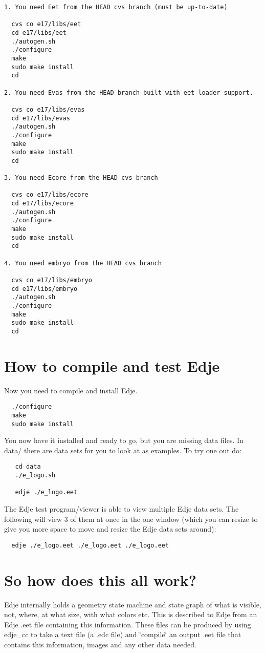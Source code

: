 \footnotesize\begin{verbatim}
1. You need Eet from the HEAD cvs branch (must be up-to-date)

  cvs co e17/libs/eet
  cd e17/libs/eet
  ./autogen.sh
  ./configure
  make
  sudo make install
  cd

2. You need Evas from the HEAD branch built with eet loader support.

  cvs co e17/libs/evas
  cd e17/libs/evas
  ./autogen.sh
  ./configure
  make
  sudo make install
  cd
  
3. You need Ecore from the HEAD cvs branch

  cvs co e17/libs/ecore
  cd e17/libs/ecore
  ./autogen.sh
  ./configure
  make
  sudo make install
  cd

4. You need embryo from the HEAD cvs branch

  cvs co e17/libs/embryo
  cd e17/libs/embryo
  ./autogen.sh
  ./configure
  make
  sudo make install
  cd

\end{verbatim}
\normalsize
\hypertarget{index_compiling}{}\section{How to compile and test Edje}\label{index_compiling}
Now you need to compile and install Edje.



\footnotesize\begin{verbatim}
  ./configure
  make
  sudo make install
\end{verbatim}
\normalsize


You now have it installed and ready to go, but you are missing data files. In data/ there are data sets for you to look at as examples. To try one out do:



\footnotesize\begin{verbatim}
   cd data
   ./e_logo.sh
   
   edje ./e_logo.eet
\end{verbatim}
\normalsize


The Edje test program/viewer is able to view multiple Edje data sets. The following will view 3 of them at once in the one window (which you can resize to give you more space to move and resize the Edje data sets around):



\footnotesize\begin{verbatim}
  edje ./e_logo.eet ./e_logo.eet ./e_logo.eet
\end{verbatim}
\normalsize
\hypertarget{index_details}{}\section{So how does this all work?}\label{index_details}
Edje internally holds a geometry state machine and state graph of what is visible, not, where, at what size, with what colors etc. This is described to Edje from an Edje .eet file containing this information. These files can be produced by using edje\_\-cc to take a text file (a .edc file) and \char`\"{}compile\char`\"{} an output .eet file that contains this information, images and any other data needed.

